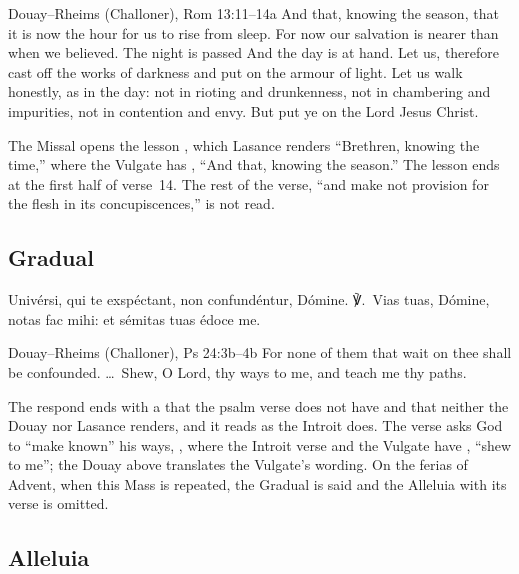 \begin{englishwitness}{Douay--Rheims (Challoner), Rom 13:11--14a}
And that, knowing the season, that it is now the hour for us to rise from
sleep. For now our salvation is nearer than when we believed. The night is
passed And the day is at hand. Let us, therefore cast off the works of
darkness and put on the armour of light. Let us walk honestly, as in the day:
not in rioting and drunkenness, not in chambering and impurities, not in
contention and envy. But put ye on the Lord Jesus Christ.
\end{englishwitness}

\noindent The Missal opens the lesson , which Lasance
renders ``Brethren, knowing the time,'' where the Vulgate has , ``And that, knowing the season.'' The lesson ends at the
first half of verse~14. The rest of the verse, ``and make not provision for
the flesh in its concupiscences,'' is not read.

\subsection{Gradual}
\label{proper-gradual}


\begin{latinproper}
Univérsi, qui te exspéctant, non confundéntur, Dómine. ℣.~Vias tuas, Dómine,
notas fac mihi: et sémitas tuas édoce me.
\end{latinproper}

\begin{englishwitness}{Douay--Rheims (Challoner), Ps 24:3b--4b}
For none of them that wait on thee shall be confounded. \dots\ Shew, O Lord,
thy ways to me, and teach me thy paths.
\end{englishwitness}

\noindent The respond ends with a  that the psalm verse does not
have and that neither the Douay nor Lasance renders, and it reads  as the Introit does. The verse asks God to ``make known'' his
ways, , where the Introit verse and the Vulgate have
, ``shew to me''; the Douay above translates the
Vulgate's wording. On the ferias of Advent, when this Mass is repeated, the
Gradual is said and the Alleluia with its verse is omitted.

\subsection{Alleluia}
\label{proper-alleluia}

